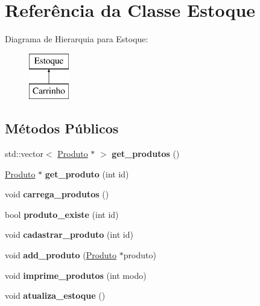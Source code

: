 \hypertarget{class_estoque}{}\section{Referência da Classe Estoque}
\label{class_estoque}
Diagrama de Hierarquia para Estoque\+:\begin{figure}[H]
\begin{center}
\leavevmode
\includegraphics[height=2.000000cm]{class_estoque}
\end{center}
\end{figure}
\subsection*{Métodos Públicos}
\begin{DoxyCompactItemize}
\item 
\mbox{\label{class_estoque_a109a5b787075cbba0f4eed2e7ec11a93}} 
std\+::vector$<$ \hyperlink{class_produto}{Produto} $\ast$ $>$ {\bfseries get\+\_\+produtos} ()
\item 
\mbox{\label{class_estoque_a22da426fe25845cbb7eb870176cdaf1e}} 
\hyperlink{class_produto}{Produto} $\ast$ {\bfseries get\+\_\+produto} (int id)
\item 
\mbox{\label{class_estoque_a62209f5dcf7cea9fb6ed477ba2dfe824}} 
void {\bfseries carrega\+\_\+produtos} ()
\item 
\mbox{\label{class_estoque_ae18931cd4e0d31690d22d132b49b6f95}} 
bool {\bfseries produto\+\_\+existe} (int id)
\item 
\mbox{\label{class_estoque_aaff596864575f6c19cbec7a5501d2b8e}} 
void {\bfseries cadastrar\+\_\+produto} (int id)
\item 
\mbox{\label{class_estoque_a8793cb7574f391925d3eaee240ab6ab2}} 
void {\bfseries add\+\_\+produto} (\hyperlink{class_produto}{Produto} $\ast$produto)
\item 
\mbox{\label{class_estoque_a78d877f97f9aa74ddf73c1430306cc6d}} 
void {\bfseries imprime\+\_\+produtos} (int modo)
\item 
\mbox{\label{class_estoque_a72d2e8d79a26cb338c26afccd3e0b8c9}} 
void {\bfseries atualiza\+\_\+estoque} ()
\end{DoxyCompactItemize}

